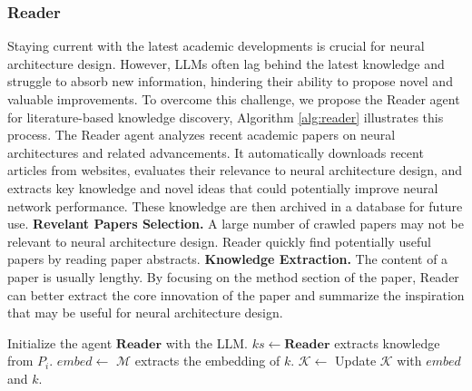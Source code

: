 \subsubsection{Reader}
Staying current with the latest academic developments is crucial for neural architecture design. However, LLMs often lag behind the latest knowledge and struggle to absorb new information, hindering their ability to propose novel and valuable improvements. To overcome this challenge, we propose the Reader agent for literature-based knowledge discovery, Algorithm \ref{alg:reader} illustrates this process.
The Reader agent analyzes recent academic papers on neural architectures and related advancements. It automatically downloads recent articles from websites, evaluates their relevance to neural architecture design, and extracts key knowledge and novel ideas that could potentially improve neural network performance. These knowledge are then archived in a database for future use.
\textbf{Revelant Papers Selection.} A large number of crawled papers may not be relevant to neural architecture design. Reader quickly find potentially useful papers by reading paper abstracts.
\textbf{Knowledge Extraction.} The content of a paper is usually lengthy. By focusing on the method section of the paper, Reader can better extract the core innovation of the paper and summarize the inspiration that may be useful for neural architecture design.
\begin{algorithm}[t]
    \caption{Knowledge extraction process of Reader}
    \begin{algorithmic}[1]
    \label{alg:reader}
    \STATE Initialize the agent $\mathbf{Reader}$ with the LLM.
            \STATE $ks\leftarrow \mathbf{Reader}$ extracts knowledge from $P_i$.
                \STATE $embed\leftarrow$ $\mathcal{M}$ extracts the embedding of $k$.
                \STATE $\mathcal{K}\leftarrow$ Update $\mathcal{K}$ with $embed$ and $k$.
            \ENDFOR
        \ENDIF
    \ENDFOR
    \end{algorithmic}
\end{algorithm}
